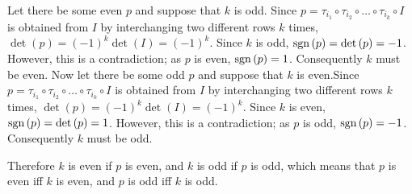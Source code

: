 \documentclass{article}
\begin{document}
Let there be some even $p$ and suppose that $k$ is odd. Since $p = \tau_{i_1} \circ \tau_{i_2} \circ \ldots \circ \tau_{i_k} \circ I$ is obtained from $I$ by interchanging two different rows $k$ times, $\det\left(p\right) = \left(-1\right)^k\det\left(I\right) = \left(-1\right)^k$.  Since $k$ is odd, $\operatorname{sgn}\left(p\right) = \det\left(p\right) = -1$. However, this is a contradiction; as $p$ is even, $\operatorname{sgn}\left(p\right) = 1$. Consequently $k$ must be even. Now let there be some odd $p$ and suppose that $k$ is even.Since $p = \tau_{i_1} \circ \tau_{i_2} \circ \ldots \circ \tau_{i_k} \circ I$ is obtained from $I$ by interchanging two different rows $k$ times, $\det\left(p\right) = \left(-1\right)^k\det\left(I\right) = \left(-1\right)^k$. Since $k$ is even, $\operatorname{sgn}\left(p\right) = \det\left(p\right) = 1$. However, this is a contradiction; as $p$ is odd, $\operatorname{sgn}\left(p\right) = -1$. Consequently $k$ must be odd.

Therefore $k$ is even if $p$ is even, and $k$ is odd if $p$ is odd, which means that $p$ is even iff $k$ is even, and $p$ is odd iff $k$ is odd.
\end{document}
